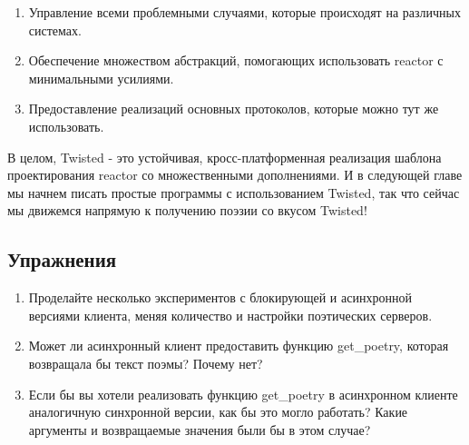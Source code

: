 \begin{enumerate}

\item Управление всеми проблемными случаями, которые происходят на 
различных системах.

\item Обеспечение множеством абстракций, помогающих использовать 
reactor с минимальными усилиями.

\item Предоставление реализаций основных протоколов, которые можно тут же использовать.

\end{enumerate}

В целом, Twisted - это устойчивая, кросс-платформенная 
реализация шаблона проектирования reactor со 
множественными дополнениями. И в следующей главе мы 
начнем писать простые программы с использованием Twisted, 
так что сейчас мы движемся напрямую к получению поэзии со вкусом Twisted!


\subsection{Упражнения}

\begin{enumerate}

\item Проделайте несколько экспериментов с блокирующей 
и асинхронной версиями клиента, меняя количество и настройки 
поэтических серверов.

\item Может ли асинхронный клиент предоставить функцию get\_poetry, 
которая возвращала бы текст поэмы? Почему нет?

\item Если бы вы хотели реализовать функцию get\_poetry в 
асинхронном клиенте аналогичную синхронной версии, как бы 
это могло работать? Какие аргументы и возвращаемые значения  
были бы в этом случае?

\end{enumerate}



